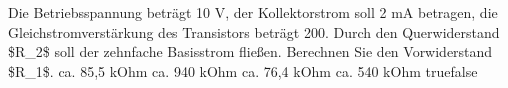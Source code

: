     {Die Betriebsspannung beträgt 10 V, der Kollektorstrom soll 2 mA betragen, die Gleichstromverstärkung des Transistors beträgt 200. Durch den Querwiderstand \$R\_2\$ soll der zehnfache Basisstrom fließen. Berechnen Sie den Vorwiderstand \$R\_1\$.}
    {ca. 85,5 kOhm}
    {ca. 940 kOhm}
    {ca. 76,4 kOhm}
    {ca. 540 kOhm}
    {true}{false}